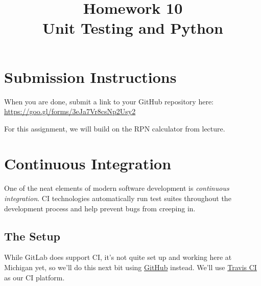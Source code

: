 \documentclass{article}
\begin{document}
\fancyhead[C]{}
\fancyhead[L]{}
\fancyhead[R]{}

\fancyfoot[C]{\color{gray} \thepage~/~\pageref*{LastPage}}
\pagestyle{fancyplain}


\title{\textbf{Homework 10\\Unit Testing and Python}}
\author{\textbf{\color{red}{Due: Wednesday, November 8, 11:59PM (Hard Deadline)}}}
\date{}
\maketitle

\section*{Submission Instructions}
When you are done, submit a link to your GitHub repository here: \url{https://goo.gl/forms/3eJa7Vr8csNp2Usy2}

\bigskip

\begin{mdframed}\centering
For this assignment, we will build on the RPN calculator from lecture.
\end{mdframed}



\section{Continuous Integration}
One of the neat elements of modern software development is \emph{continuous
  integration}. CI technologies automatically run test suites throughout the
development process and help prevent bugs from creeping in.

\subsection{The Setup}

While GitLab does support CI, it's not quite set up and working here at
Michigan yet, so we'll do this next bit using
\href{https://github.com}{GitHub} instead.
We'll use \href{https://travis-ci.org/}{Travis CI} as our CI platform.
\end{document}
